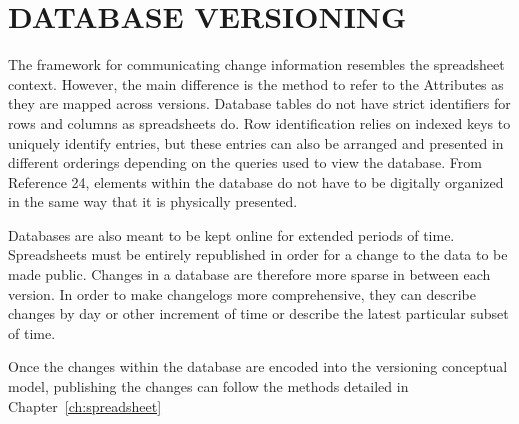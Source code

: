
\chapter{DATABASE VERSIONING}

The framework for communicating change information resembles the spreadsheet context.  However, the main difference is the method to refer to the Attributes as they are mapped across versions.  Database tables do not have strict identifiers for rows and columns as spreadsheets do.  Row identification relies on indexed keys to uniquely identify entries, but these entries can also be arranged and presented in different orderings depending on the queries used to view the database.  From Reference 24, elements within the database do not have to be digitally organized in the same way that it is physically presented.

Databases are also meant to be kept online for extended periods of time.  Spreadsheets must be entirely republished in order for a change to the data to be made public.  Changes in a database are therefore more sparse in between each version.  In order to make changelogs more comprehensive, they can describe changes by day or other increment of time or describe the latest particular subset of time.

Once the changes within the database are encoded into the versioning conceptual model, publishing the changes can follow the methods detailed in Chapter~\ref{ch:spreadsheet}